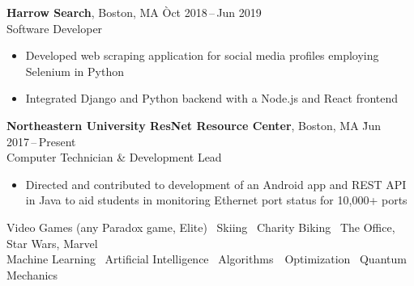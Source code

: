 \documentclass[11pt]{article}
\newcommand{\ressection}[1]{%
  \vspace{12pt}{\Large{\textsc{#1}}} \titlerule[0.5pt] \par
}
\begin{document}
\begin{tabbing}
  \textbf{Harrow Search}, Boston, MA \` Oct 2018\,--\,Jun 2019 \\
  Software Developer
\end{tabbing}
\begin{itemize}
  \item Developed web scraping application for social media profiles employing Selenium in Python
  \item Integrated Django and Python backend with a Node.js and React frontend
\end{itemize}

\begin{tabbing}
  \textbf{Northeastern University ResNet Resource Center}, Boston, MA \` Jun 2017\,--\,Present \\
  Computer Technician \& Development Lead
\end{tabbing}
\begin{itemize}
  \item Directed and contributed to development of an Android app and REST API in Java to aid students in monitoring Ethernet port status for 10,000+ ports
\end{itemize}

\ressection{Interests}
\begin{center}
Video Games (any Paradox game, Elite) \textbullet\ Skiing \textbullet\ Charity Biking \textbullet\ The Office, Star Wars, Marvel \\
Machine Learning \textbullet\ Artificial Intelligence \textbullet\ Algorithms\ \textbullet\ Optimization \textbullet\ Quantum Mechanics
\end{center}
\end{document}
